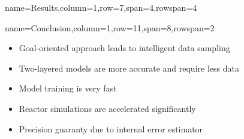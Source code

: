 \documentclass[
	accentcolor=3c,
	boxstyle=colored, %
	colorback=false,
	title=small
	]{tudasciposter}
\begin{document}
\begin{tcbposter}[
	poster={
		columns=8,
		rows=12,
		spacing=1cm,
	},]
\begin{posterboxenv}[title=3. Results]{name=Results,column=1,row=7,span=4,rowspan=4}
	


\end{posterboxenv}

\begin{posterboxenv}[title=4. Conclusion]{name=Conclusion,column=1,row=11,span=8,rowspan=2}
\begin{multicols}{2}		
	\begin{itemize}
		\item Goal-oriented approach leads to intelligent data sampling
		\item Two-layered models are more accurate and require less data
		\item Model training is very fast
		\item Reactor simulations are accelerated significantly
		\item Precision guaranty due to internal error estimator
	\end{itemize}
\end{multicols}

\end{posterboxenv}

\end{tcbposter}
\end{document}
